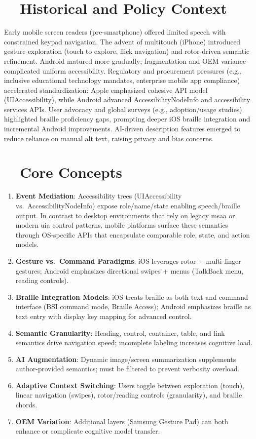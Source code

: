 \section{~~Historical and Policy Context}
\label{sec:sr26-history}
Early mobile screen readers (pre-smartphone) offered limited speech with constrained keypad navigation. The advent of multitouch (iPhone) introduced gesture exploration (touch to explore, flick navigation) and rotor-driven semantic refinement. Android matured more gradually; fragmentation and OEM variance complicated uniform accessibility. Regulatory and procurement pressures (e.g., inclusive educational technology mandates, enterprise mobile app compliance) accelerated standardization: Apple emphasized cohesive API model (UIAccessibility), while Android advanced AccessibilityNodeInfo and accessibility services APIs. User advocacy and global surveys (e.g., adoption/usage studies) highlighted braille proficiency gaps, prompting deeper iOS braille integration and incremental Android improvements. AI-driven description features emerged to reduce reliance on manual alt text, raising privacy and bias concerns.

\section{~~Core Concepts}
\label{sec:sr26-core-concepts}
\begin{enumerate}
	\item \textbf{Event Mediation}: Accessibility trees (UIAccessibility vs.\ AccessibilityNodeInfo) expose role/name/state enabling speech/braille output. In contrast to desktop environments that rely on legacy \gls{msaa} or modern \gls{uia} control patterns, mobile platforms surface these semantics through OS-specific APIs that encapsulate comparable role, state, and action models.
	\item \textbf{Gesture vs.\ Command Paradigms}: iOS leverages rotor + multi-finger gestures; Android emphasizes directional swipes + menus (TalkBack menu, reading controls).
	\item \textbf{Braille Integration Models}: iOS treats braille as both text and command interface (BSI command mode, Braille Access); Android emphasizes braille as text entry with display key mapping for advanced control.
	\item \textbf{Semantic Granularity}: Heading, control, container, table, and link semantics drive navigation speed; incomplete labeling increases cognitive load.
	\item \textbf{AI Augmentation}: Dynamic image/screen summarization supplements author-provided semantics; must be filtered to prevent verbosity overload.
	\item \textbf{Adaptive Context Switching}: Users toggle between exploration (touch), linear navigation (swipes), rotor/reading controls (granularity), and braille chords.
	\item \textbf{OEM Variation}: Additional layers (Samsung Gesture Pad) can both enhance or complicate cognitive model transfer.
\end{enumerate}

